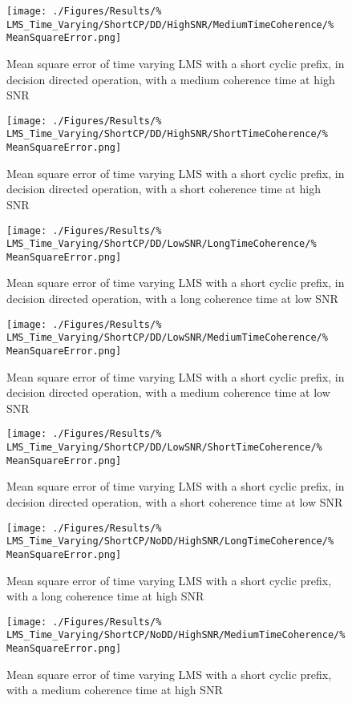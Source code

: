 \begin{figure}[ht]
	\texttt{[image: ./Figures/Results/\%
LMS\_Time\_Varying/ShortCP/DD/HighSNR/MediumTimeCoherence/\%
MeanSquareError.png]}
	\caption{Mean square error of time varying LMS with a 
	short cyclic prefix, in decision directed operation, 
	with a medium coherence time at high SNR}
\end{figure}
\begin{figure}[ht]
	\texttt{[image: ./Figures/Results/\%
LMS\_Time\_Varying/ShortCP/DD/HighSNR/ShortTimeCoherence/\%
MeanSquareError.png]}
	\caption{Mean square error of time varying LMS with a 
	short cyclic prefix, in decision directed operation, 
	with a short coherence time at high SNR}
\end{figure}
\begin{figure}[ht]
	\texttt{[image: ./Figures/Results/\%
LMS\_Time\_Varying/ShortCP/DD/LowSNR/LongTimeCoherence/\%
MeanSquareError.png]}
	\caption{Mean square error of time varying LMS with a 
	short cyclic prefix, in decision directed operation, 
	with a long coherence time at low SNR}
\end{figure}
\begin{figure}[ht]
	\texttt{[image: ./Figures/Results/\%
LMS\_Time\_Varying/ShortCP/DD/LowSNR/MediumTimeCoherence/\%
MeanSquareError.png]}
	\caption{Mean square error of time varying LMS with a 
	short cyclic prefix, in decision directed operation, 
	with a medium coherence time at low SNR}
\end{figure}
\begin{figure}[ht]
	\texttt{[image: ./Figures/Results/\%
LMS\_Time\_Varying/ShortCP/DD/LowSNR/ShortTimeCoherence/\%
MeanSquareError.png]}
	\caption{Mean square error of time varying LMS with a 
	short cyclic prefix, in decision directed operation, 
	with a short coherence time at low SNR}
\end{figure}
\begin{figure}[ht]
	\texttt{[image: ./Figures/Results/\%
LMS\_Time\_Varying/ShortCP/NoDD/HighSNR/LongTimeCoherence/\%
MeanSquareError.png]}
	\caption{Mean square error of time varying LMS with a 
	short cyclic prefix, with a long coherence time at high SNR}
\end{figure}
\begin{figure}[ht]
	\texttt{[image: ./Figures/Results/\%
LMS\_Time\_Varying/ShortCP/NoDD/HighSNR/MediumTimeCoherence/\%
MeanSquareError.png]}
	\caption{Mean square error of time varying LMS with a 
	short cyclic prefix, with a medium coherence time at high SNR}
\end{figure}
